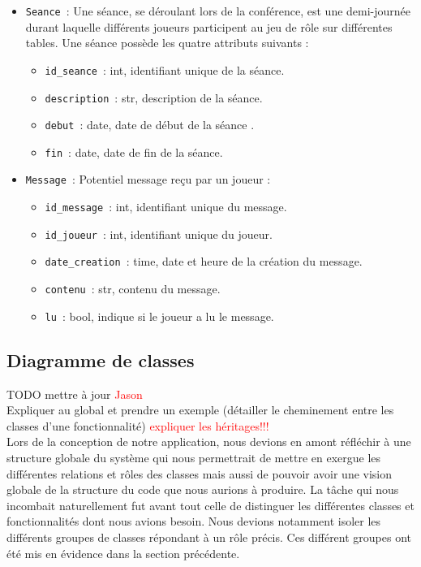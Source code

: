 \documentclass[11pt]{article}
\begin{document}
\begin{itemize}
    \item \texttt{Seance}~: Une séance, se déroulant lors de la conférence, est une demi-journée durant laquelle différents joueurs participent au jeu de rôle sur différentes tables. Une séance possède les quatre attributs suivants :
    \begin{itemize}[label=, font=\small]
        \item \texttt{id\_seance}~: int, identifiant unique de la séance.
        \item \texttt{description}~: str, description de la séance.
        \item \texttt{debut}~: date, date de début de la séance .
        \item \texttt{fin}~: date, date de fin de la séance.
    \end{itemize}
    
    \item \texttt{Message}~: Potentiel message reçu par un joueur  :
    \begin{itemize}[label=, font=\small]
        \item \texttt{id\_message}~: int, identifiant unique du message.
        \item \texttt{id\_joueur}~: int, identifiant unique du joueur.
        \item \texttt{date\_creation}~: time, date et heure de la création du message.
        \item \texttt{contenu}~: str, contenu du message.
        \item \texttt{lu}~: bool, indique si le joueur a lu le message.
    \end{itemize}
    
\end{itemize}




\subsection{Diagramme de classes}

TODO mettre à jour \textcolor{red}{Jason} \\
Expliquer au global et prendre un exemple (détailler le cheminement entre les classes d'une fonctionnalité) 
\textcolor{red}{expliquer les héritages!!!} \\

Lors de la conception de notre application, nous devions en amont réfléchir à une structure globale du système qui nous permettrait de mettre en exergue les différentes relations et rôles des classes mais aussi de pouvoir avoir une vision globale de la structure du code que nous aurions à produire.  La tâche qui nous incombait naturellement fut avant tout celle de distinguer les différentes classes et fonctionnalités dont nous avions besoin. Nous devions notamment isoler les différents groupes de classes répondant à un rôle précis. Ces différent groupes ont été mis en évidence dans la section précédente.\\
\end{document}
